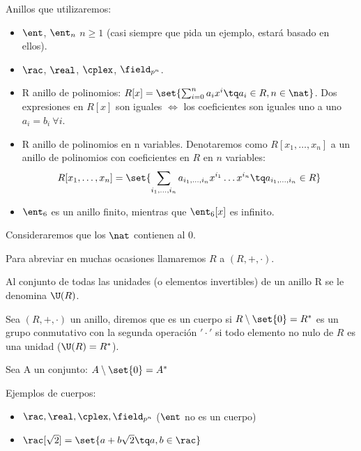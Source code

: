 \begin{example}
Anillos que utilizaremos:
\begin{itemize}
	\item $\ent$, $\ent_n$ $n \geq 1$ (casi siempre que pida un ejemplo, estará basado en ellos).
	\item $\rac$, $\real$, $\cplex$, $\field_{p^n}$.
	\item R anillo de polinomios: $R[x] = \set{ \sum_{i=0}^n a_i x^i \tq a_i \in R, n \in \nat}$. Dos expresiones en $R[x]$ son iguales $\iff$ los coeficientes son iguales uno a uno\ie $a_i = b_i \ \forall i$.
	\item R anillo de polinomios en n variables. Denotaremos como $R[x_1,\dots,x_n]$ a un anillo de polinomios con coeficientes en $R$ en $n$ variables:
	\[ R[x_1,\dots,x_n] = \set{ \sum_{i_1,\dots,i_n} a_{i_1,\dots,i_n} x^{i_1}\dots x^{i_n} \tq a_{i_1,\dots,i_n} \in R } \]
	\item $\ent_6$ es un anillo finito, mientras que $\ent_6[x]$ es infinito.
\end{itemize}
\end{example}


\nota Consideraremos que los $\nat$ contienen al 0.

\notacion Para abreviar en muchas ocasiones llamaremos $R$ a $(R,+,\cdot)$.


\begin{defn}[Unidades\IS de R: $\U(R)$]
Al conjunto de todas las unidades (o elementos invertibles) de un anillo R se le denomina $\U(R)$.
\end{defn}

\begin{defn}[Cuerpo]
Sea $(R,+,\cdot)$ un anillo, diremos que es un cuerpo si $R\setminus \set{0} = R^*$ es un grupo conmutativo con la segunda operación $'\cdot'$ \ie si todo elemento no nulo de $R$ es una unidad ($\U(R) = R^*$).
\end{defn}

\notacion Sea A un conjunto: $A\setminus \set{0} = A^*$

\begin{example} Ejemplos de cuerpos:
	\begin{itemize}
		\item $\rac, \real, \cplex, \field_{p^n}$ ($\ent$ no es un cuerpo) %
		\item $\rac[\sqrt2] = \set{ a + b\sqrt2 \tq a,b \in \rac }$
	\end{itemize}
\end{example}


